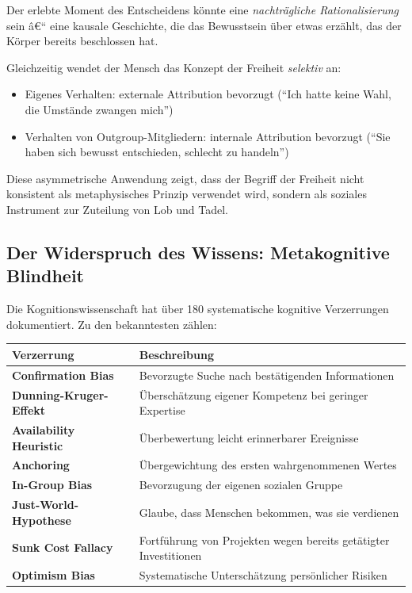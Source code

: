 ﻿\documentclass[12pt, a4paper]{article}
\begin{document}
Der erlebte Moment des Entscheidens könnte eine \emph{nachträgliche Rationalisierung}
sein â€“ eine kausale Geschichte, die das Bewusstsein über etwas erzählt, das der
Körper bereits beschlossen hat.

Gleichzeitig wendet der Mensch das Konzept der Freiheit \emph{selektiv} an:
\begin{itemize}
  \item Eigenes Verhalten: externale Attribution bevorzugt
    (\enquote{Ich hatte keine Wahl, die Umstände zwangen mich})
  \item Verhalten von Outgroup-Mitgliedern: internale Attribution bevorzugt
    (\enquote{Sie haben sich bewusst entschieden, schlecht zu handeln})
\end{itemize}
Diese asymmetrische Anwendung zeigt, dass der Begriff der Freiheit nicht
konsistent als metaphysisches Prinzip verwendet wird, sondern als soziales
Instrument zur Zuteilung von Lob und Tadel.

\subsection{Der Widerspruch des Wissens: Metakognitive Blindheit}

Die Kognitionswissenschaft hat über 180 systematische kognitive Verzerrungen
dokumentiert. Zu den bekanntesten zählen:

\medskip
\begin{tabular}{>{\bfseries}p{4.5cm} p{8.5cm}}
\toprule
Verzerrung & Beschreibung \\
\midrule
Confirmation Bias & Bevorzugte Suche nach bestätigenden Informationen \\
Dunning-Kruger-Effekt & Überschätzung eigener Kompetenz bei geringer Expertise \\
Availability Heuristic & Überbewertung leicht erinnerbarer Ereignisse \\
Anchoring & Übergewichtung des ersten wahrgenommenen Wertes \\
In-Group Bias & Bevorzugung der eigenen sozialen Gruppe \\
Just-World-Hypothese & Glaube, dass Menschen bekommen, was sie verdienen \\
Sunk Cost Fallacy & Fortführung von Projekten wegen bereits getätigter Investitionen \\
Optimism Bias & Systematische Unterschätzung persönlicher Risiken \\
\bottomrule
\end{tabular}
\medskip
\end{document}
